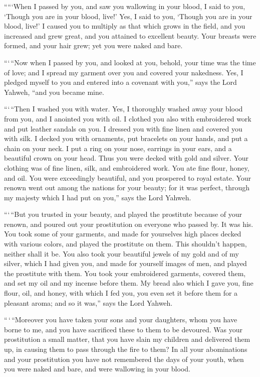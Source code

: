  `````When I passed by you, and saw you wallowing in your
blood, I said to you, `Though you are in your blood, live!' Yes, I said
to you, `Though you are in your blood, live!'  I caused you
to multiply as that which grows in the field, and you increased and grew
great, and you attained to excellent beauty. Your breasts were formed,
and your hair grew; yet you were naked and bare.

 ```\,``Now when I passed by you, and looked at you, behold,
your time was the time of love; and I spread my garment over you and
covered your nakedness. Yes, I pledged myself to you and entered into a
covenant with you,'' says the Lord Yahweh, ``and you became mine.

 ```\,``Then I washed you with water. Yes, I thoroughly
washed away your blood from you, and I anointed you with oil.
 I clothed you also with embroidered work and put leather
sandals on you. I dressed you with fine linen and covered you with silk.
 I decked you with ornaments, put bracelets on your hands,
and put a chain on your neck.  I put a ring on your nose,
earrings in your ears, and a beautiful crown on your head. 
Thus you were decked with gold and silver. Your clothing was of fine
linen, silk, and embroidered work. You ate fine flour, honey, and oil.
You were exceedingly beautiful, and you prospered to royal estate.
 Your renown went out among the nations for your beauty;
for it was perfect, through my majesty which I had put on you,'' says
the Lord Yahweh.

 ```\,``But you trusted in your beauty, and played the
prostitute because of your renown, and poured out your prostitution on
everyone who passed by. It was his.  You took some of your
garments, and made for yourselves high places decked with various
colors, and played the prostitute on them. This shouldn't happen,
neither shall it be.  You also took your beautiful jewels
of my gold and of my silver, which I had given you, and made for
yourself images of men, and played the prostitute with them.
 You took your embroidered garments, covered them, and set
my oil and my incense before them.  My bread also which I
gave you, fine flour, oil, and honey, with which I fed you, you even set
it before them for a pleasant aroma; and so it was,'' says the Lord
Yahweh.

 ``\,`\,``Moreover you have taken your sons and your
daughters, whom you have borne to me, and you have sacrificed these to
them to be devoured. Was your prostitution a small matter, 
that you have slain my children and delivered them up, in causing them
to pass through the fire to them?  In all your abominations
and your prostitution you have not remembered the days of your youth,
when you were naked and bare, and were wallowing in your blood.

